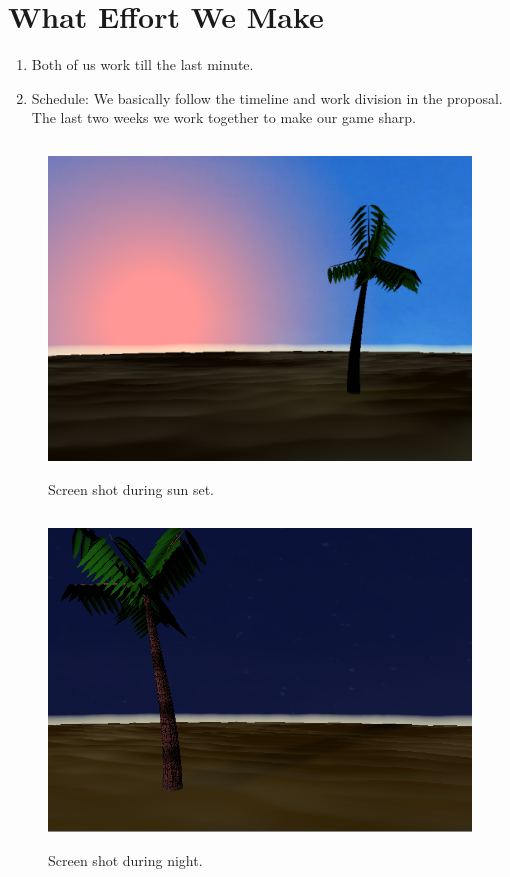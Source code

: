 \documentclass[annual]{acmsiggraph}
\begin{document}
\section{What Effort We Make}
\begin{enumerate}
\item{Both of us work till the last minute.}
\item{Schedule}: We basically follow the timeline and work division in the proposal. The last two weeks we work together to make our game sharp. 
\end{enumerate}

\nocite{*}



\begin{figure}
\begin{center}
\includegraphics[width=500pt, height = 250pt]{fig1.png}
\caption{Screen shot during sun set.}
\end{center}
\end{figure}

\begin{figure}
\begin{center}
\includegraphics[width=500pt, height = 250pt]{fig2.png}
\caption{Screen shot during night.}
\end{center}
\end{figure}
\end{document}
